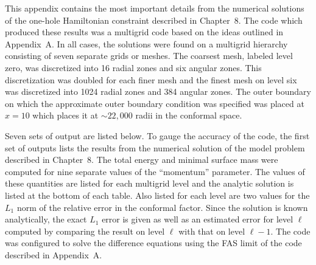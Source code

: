 This appendix contains the most important details from the numerical solutions
of the one-hole Hamiltonian constraint described in Chapter~8.  The code which
produced these results was a multigrid code based on the ideas outlined in
Appendix~A.  In all cases, the solutions were found on a multigrid hierarchy
consisting of seven separate grids or meshes.  The coarsest mesh, labeled level
zero, was discretized into 16 radial zones and six angular zones.  This
discretization was doubled for each finer mesh and the finest mesh on level six
was discretized into 1024 radial zones and 384 angular zones.  The outer
boundary on which the approximate outer boundary condition was specified was
placed at $x = 10$ which places it at $\sim22,000$ radii in the conformal
space.

Seven sets of output are listed below.  To gauge the accuracy of the code, the
first set of outputs lists the results from the numerical solution of the model
problem described in Chapter~8.  The total energy and minimal surface mass were
computed for nine separate values of the ``momentum'' parameter.  The values of
these quantities are listed for each multigrid level and the analytic solution
is listed at the bottom of each table.  Also listed for each level are two
values for  the $L_1$ norm of the relative error in the conformal factor.  Since
the solution is known analytically, the exact $L_1$ error is given as well as an
estimated error for level $\ell$ computed by comparing the result on level
$\ell$  with that on level $\ell-1$.  The code was configured to solve the
difference equations using the FAS limit of the code described in Appendix~A.


